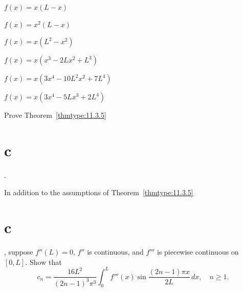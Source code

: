 \begin{exerciselist}

  \item\label{exer:11.3.36} \Cex $f(x)=x(L-x)$

  \item\label{exer:11.3.37} \Cex\quad$f(x)=x^{2}(L-x)$

  \item\label{exer:11.3.38} $f(x)=x(L^{2}-x^{2})$

  \item\label{exer:11.3.39} $f(x)=x(x^{3}-2Lx^{2}+L^{3})$

  \item\label{exer:11.3.40} $f(x)=x(3x^{4}-10L^{2}x^{2}+7L^{4})$

  \item\label{exer:11.3.41} $f(x)=x(3x^{4}-5Lx^{3}+2L^{4})$

  \item\label{exer:11.3.42}
  \begin{alist}
    \item %
    Prove Theorem~\ref{thmtype:11.3.5}\part{c}.

    \item %
    In addition to the assumptions of Theorem~\ref{thmtype:11.3.5}\part{c}, suppose $f''(L)=0$,
    $f''$ is continuous, and $f'''$ is piecewise continuous on $[0,L]$. Show that
    \[
      c_{n}=\frac{16L^{2}}{(2n-1)^{3}\pi^{3}}\int_{0}^{L}f'''(x)\sin\frac{(2n-1)\pi x}{2L}\,dx,\quad n\ge1.
    \]
  \end{alist}



\end{exerciselist}
